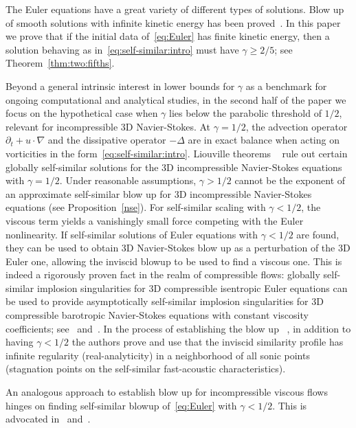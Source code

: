 \documentclass[11pt,reqno]{amsproc}
\numberwithin{equation}{section}
\theoremstyle{remark}
\begin{document}
The Euler equations have a great variety of different types of solutions. Blow up of smooth solutions with infinite kinetic energy has been proved~\cite{child,Cric,gib,jtstuart}. In this paper we prove that if the initial data of~\eqref{eq:Euler} has finite kinetic energy, then a solution behaving as in~\eqref{eq:self-similar:intro} must have $\gamma \geq 2/5$; see Theorem~\ref{thm:two:fifths}.

 
Beyond a general intrinsic interest in lower bounds for $\gamma$ as a benchmark for ongoing computational and analytical studies, in the second half of the paper we focus on the hypothetical case  when $\gamma$ lies below the parabolic threshold of $1/2$, relevant for incompressible 3D Navier-Stokes. At $\gamma = 1/2$, the advection operator $\partial_t + u \cdot \nabla$ and the dissipative operator $-\Delta$ are in exact balance when acting on vorticities in the form~\eqref{eq:self-similar:intro}.  Liouville theorems ~\cite{NRS96,Tsai98,Seregin05,ChaeWolf17} rule out certain globally self-similar solutions  for the 3D incompressible Navier-Stokes equations with $\gamma=1/2$. Under reasonable assumptions, $\gamma >1/2$ cannot be the exponent of an approximate self-similar blow up for 3D incompressible Navier-Stokes equations (see Proposition~\ref{nse}). 
For self-similar scaling with  $\gamma < 1/2$, the viscous term yields a vanishingly small force competing with  the Euler nonlinearity.  If self-similar solutions of Euler equations with $\gamma< 1/2$ are found,
they can be used to obtain  3D Navier-Stokes blow up as a perturbation of the 3D Euler one,  allowing the inviscid blowup to be used to find a viscous one. This is indeed a rigorously proven fact in the realm of compressible flows: globally self-similar implosion singularities for 3D compressible isentropic Euler equations can be used to provide asymptotically self-similar implosion singularities for 3D compressible barotropic Navier-Stokes equations with constant viscosity coefficients; see~\cite{MRRS22a,MRRS22b} and~\cite{BCG25,SWWZ25}. In the process of establishing the blow up ~\cite{MRRS22b,BCG25,SWWZ25},
in addition to having $\gamma<1/2$ the authors prove and use that the inviscid similarity profile has infinite regularity (real-analyticity) in a neighborhood of all  sonic points (stagnation points on the self-similar fast-acoustic characteristics). 

An analogous approach to establish blow up for incompressible viscous flows hinges on finding self-similar blowup of~\eqref{eq:Euler} with $\gamma < 1/2$. This is advocated in~\cite{WLGZB23}  and~\cite{WangEtAl25}. 
\end{document}
